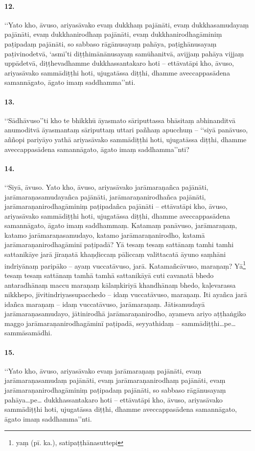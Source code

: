 \paragraph{12.} ‘‘Yato kho, āvuso, ariyasāvako evaṃ dukkhaṃ pajānāti, evaṃ dukkhasamudayaṃ pajānāti, evaṃ dukkhanirodhaṃ pajānāti, evaṃ dukkhanirodhagāminiṃ paṭipadaṃ pajānāti, so sabbaso rāgānusayaṃ pahāya, paṭighānusayaṃ paṭivinodetvā, ‘asmī’ti diṭṭhimānānusayaṃ samūhanitvā, avijjaṃ pahāya vijjaṃ uppādetvā, diṭṭhevadhamme dukkhassantakaro hoti – ettāvatāpi kho, āvuso, ariyasāvako sammādiṭṭhi hoti, ujugatāssa diṭṭhi, dhamme aveccappasādena samannāgato, āgato imaṃ saddhamma’’nti.

\paragraph{13.} ‘‘Sādhāvuso’’ti kho te bhikkhū āyasmato sāriputtassa bhāsitaṃ abhinanditvā anumoditvā āyasmantaṃ sāriputtaṃ uttari pañhaṃ apucchuṃ – ‘‘siyā panāvuso, aññopi pariyāyo yathā ariyasāvako sammādiṭṭhi hoti, ujugatāssa diṭṭhi, dhamme aveccappasādena samannāgato, āgato imaṃ saddhamma’’nti?

\paragraph{14.} ‘‘Siyā, āvuso. Yato kho, āvuso, ariyasāvako jarāmaraṇañca pajānāti, jarāmaraṇasamudayañca pajānāti, jarāmaraṇanirodhañca pajānāti, jarāmaraṇanirodhagāminiṃ paṭipadañca pajānāti – ettāvatāpi kho, āvuso, ariyasāvako sammādiṭṭhi hoti, ujugatāssa diṭṭhi, dhamme aveccappasādena samannāgato, āgato imaṃ saddhammaṃ. Katamaṃ panāvuso, jarāmaraṇaṃ, katamo jarāmaraṇasamudayo, katamo jarāmaraṇanirodho, katamā jarāmaraṇanirodhagāminī paṭipadā? Yā tesaṃ tesaṃ sattānaṃ tamhi tamhi sattanikāye jarā jīraṇatā khaṇḍiccaṃ pāliccaṃ valittacatā āyuno saṃhāni indriyānaṃ paripāko – ayaṃ vuccatāvuso, jarā. Katamañcāvuso, maraṇaṃ? Yā\footnote{yaṃ (pī. ka.), satipaṭṭhānasuttepi} tesaṃ tesaṃ sattānaṃ tamhā tamhā sattanikāyā cuti cavanatā bhedo antaradhānaṃ maccu maraṇaṃ kālaṃkiriyā khandhānaṃ bhedo, kaḷevarassa nikkhepo, jīvitindriyassupacchedo – idaṃ vuccatāvuso, maraṇaṃ. Iti ayañca jarā idañca maraṇaṃ – idaṃ vuccatāvuso, jarāmaraṇaṃ. Jātisamudayā jarāmaraṇasamudayo, jātinirodhā jarāmaraṇanirodho, ayameva ariyo aṭṭhaṅgiko maggo jarāmaraṇanirodhagāminī paṭipadā, seyyathidaṃ – sammādiṭṭhi…pe… sammāsamādhi.

\paragraph{15.} ‘‘Yato kho, āvuso, ariyasāvako evaṃ jarāmaraṇaṃ pajānāti, evaṃ jarāmaraṇasamudaṃ pajānāti, evaṃ jarāmaraṇanirodhaṃ pajānāti, evaṃ jarāmaraṇanirodhagāminiṃ paṭipadaṃ pajānāti, so sabbaso rāgānusayaṃ pahāya…pe… dukkhassantakaro hoti – ettāvatāpi kho, āvuso, ariyasāvako sammādiṭṭhi hoti, ujugatāssa diṭṭhi, dhamme aveccappasādena samannāgato, āgato imaṃ saddhamma’’nti.

